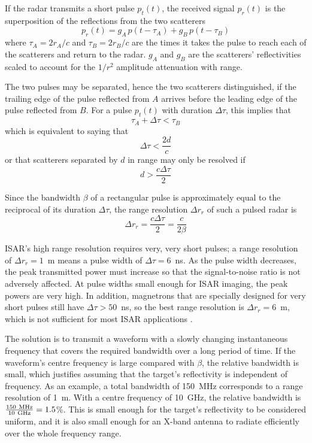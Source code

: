 If the radar transmits a short pulse $p_t(t)$, the received signal $p_r(t)$ is 
the superposition of the reflections from the two scatterers
\begin{equation}
p_r(t)=g_A\,p(t-\tau_A)+g_B\,p(t-\tau_B)
\end{equation}
where $\tau_A=2r_A/c$ and $\tau_B=2r_B/c$ are the times it takes the pulse
to reach each of the scatterers and return to the radar.  $g_A$ and $g_B$
are the scatterers' reflectivities scaled to account for the $1/r^2$
amplitude attenuation with range.  

The two pulses may be separated, hence the two scatterers distinguished, if
the trailing edge of the pulse reflected from $A$ arrives before the leading
edge of the pulse reflected from $B$.  For a pulse $p_t(t)$ with duration
$\Delta\tau$, this implies that
\begin{equation}
\tau_A+\Delta\tau<\tau_B
\end{equation}
which is equivalent to saying that 
\begin{equation}
\Delta\tau<\frac{2d}{c}
\end{equation}
or that scatterers separated by $d$ in range may only be resolved if
\begin{equation}
d>\frac{c\Delta\tau}{2}
\end{equation}

Since the bandwidth $\beta$ of a rectangular pulse is approximately equal to
the reciprocal of its duration $\Delta\tau$, the range resolution 
$\Delta r_r$ of such a pulsed radar is 
\begin{equation}\label{hrr eqn:pulsed res}
\Delta r_r=\frac{c\Delta\tau}{2}=\frac{c}{2\beta}
\end{equation}

ISAR's high range resolution requires very, very short pulses; a range 
resolution of $\Delta r_r=1$~m means a pulse width of $\Delta\tau=6$~ns.  As
the pulse width decreases, the peak transmitted power must increase so that
the signal-to-noise ratio is not adversely affected.  At pulse widths small
enough for ISAR imaging, the peak powers are very high.  In addition,
magnetrons that are specially designed for very short pulses still have
$\Delta\tau>50$~ns, so the best range resolution is $\Delta r_r=6$~m, which
is not sufficient for most ISAR applications \cite[p. 104]{Weh87}.

The solution is to transmit a waveform with a slowly changing instantaneous
frequency that covers the required bandwidth over a long period of time. If
the waveform's centre frequency is large compared with $\beta$, the relative
bandwidth is small, which justifies assuming that the target's reflectivity 
is independent of frequency.  As an example, a total bandwidth of 150~MHz
corresponds to a range resolution of 1~m.  With a centre frequency of 10~GHz,
the relative bandwidth is $\frac{150\ {\rm MHz}}{10\ {\rm GHz}}=1.5$\%. 
This is small enough for the target's reflectivity to be considered uniform,
and it is also small enough for an X-band antenna to radiate efficiently
over the whole frequency range. 


